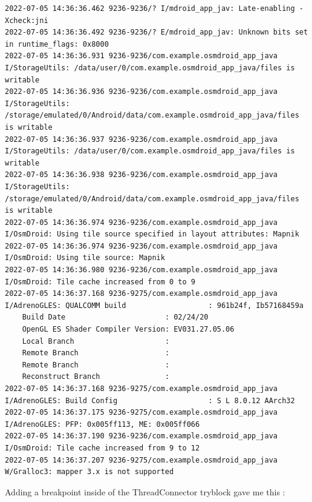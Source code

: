 \documentclass[a4paper,12pt]{book}
\begin{document}
\begin{lstlisting}
2022-07-05 14:36:36.462 9236-9236/? I/mdroid_app_jav: Late-enabling -Xcheck:jni
2022-07-05 14:36:36.492 9236-9236/? E/mdroid_app_jav: Unknown bits set in runtime_flags: 0x8000
2022-07-05 14:36:36.931 9236-9236/com.example.osmdroid_app_java I/StorageUtils: /data/user/0/com.example.osmdroid_app_java/files is writable
2022-07-05 14:36:36.936 9236-9236/com.example.osmdroid_app_java I/StorageUtils: /storage/emulated/0/Android/data/com.example.osmdroid_app_java/files is writable
2022-07-05 14:36:36.937 9236-9236/com.example.osmdroid_app_java I/StorageUtils: /data/user/0/com.example.osmdroid_app_java/files is writable
2022-07-05 14:36:36.938 9236-9236/com.example.osmdroid_app_java I/StorageUtils: /storage/emulated/0/Android/data/com.example.osmdroid_app_java/files is writable
2022-07-05 14:36:36.974 9236-9236/com.example.osmdroid_app_java I/OsmDroid: Using tile source specified in layout attributes: Mapnik
2022-07-05 14:36:36.974 9236-9236/com.example.osmdroid_app_java I/OsmDroid: Using tile source: Mapnik
2022-07-05 14:36:36.980 9236-9236/com.example.osmdroid_app_java I/OsmDroid: Tile cache increased from 0 to 9
2022-07-05 14:36:37.168 9236-9275/com.example.osmdroid_app_java I/AdrenoGLES: QUALCOMM build                   : 961b24f, Ib57168459a
    Build Date                       : 02/24/20
    OpenGL ES Shader Compiler Version: EV031.27.05.06
    Local Branch                     : 
    Remote Branch                    : 
    Remote Branch                    : 
    Reconstruct Branch               : 
2022-07-05 14:36:37.168 9236-9275/com.example.osmdroid_app_java I/AdrenoGLES: Build Config                     : S L 8.0.12 AArch32
2022-07-05 14:36:37.175 9236-9275/com.example.osmdroid_app_java I/AdrenoGLES: PFP: 0x005ff113, ME: 0x005ff066
2022-07-05 14:36:37.190 9236-9236/com.example.osmdroid_app_java I/OsmDroid: Tile cache increased from 9 to 12
2022-07-05 14:36:37.207 9236-9275/com.example.osmdroid_app_java W/Gralloc3: mapper 3.x is not supported
\end{lstlisting}

Adding a breakpoint inside of the ThreadConnector tryblock gave me this :
\end{document}
